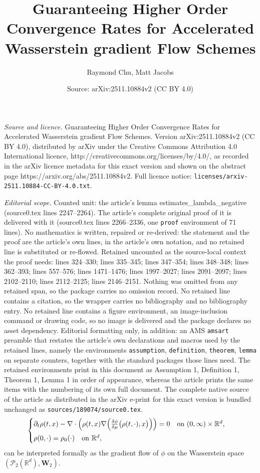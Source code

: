 \documentclass[10pt,a4paper]{amsart}
\title{Guaranteeing Higher Order Convergence Rates for Accelerated Wasserstein gradient Flow Schemes}
\author{Raymond Chu, Matt Jacobs}
\date{Source: arXiv:2511.10884v2 (CC BY 4.0)}
\newcommand{\PP}{\mathcal{P}}
\newcommand{\R}{{\mathbb R}}
\begin{document}
\maketitle

\noindent\emph{Source and licence.} Guaranteeing Higher Order Convergence Rates for Accelerated Wasserstein gradient Flow Schemes. Version arXiv:2511.10884v2 (CC BY 4.0), distributed by arXiv under the Creative Commons Attribution 4.0 International licence, http://creativecommons.org/licenses/by/4.0/, as recorded in the arXiv licence metadata for this exact version and shown on the abstract page https://arxiv.org/abs/2511.10884v2. Full licence notice: \texttt{licenses/arxiv-2511.10884-CC-BY-4.0.txt}.\par\smallskip

\noindent\textit{Editorial scope.} Counted unit: the article's lemma estimates\_lambda\_negative (source0.tex lines 2247--2264). The article's complete original proof of it is delivered with it (source0.tex lines 2266--2336, one \texttt{proof} environment of 71 lines). No mathematics is written, repaired or re-derived: the statement and the proof are the article's own lines, in the article's own notation, and no retained line is substituted or re-flowed.  Retained uncounted as the source-local context the proof needs: lines 324--330; lines 335--345; lines 347--354; lines 348--348; lines 362--393; lines 557--576; lines 1471--1476; lines 1997--2027; lines 2091--2097; lines 2102--2110; lines 2112--2125; lines 2146--2151.  Nothing was omitted from any retained span, so the package carries no omission record.  No retained line contains a citation, so the wrapper carries no bibliography and no bibliography entry.  No retained line contains a figure environment, an image-inclusion command or drawing code, so no image is delivered and the package declares no asset dependency.  Editorial formatting only, in addition: an AMS \texttt{amsart} preamble that restates the article's own declarations and macros used by the retained lines, namely the environments \texttt{assumption}, \texttt{definition}, \texttt{theorem}, \texttt{lemma} on separate counters, together with the standard packages those lines need.  The retained environments print in this document as Assumption 1, Definition 1, Theorem 1, Lemma 1 in order of appearance, whereas the article prints the same items with the numbering of its own full document.  The complete native source of the article as distributed in the arXiv e-print for this exact version is bundled unchanged as \texttt{sources/189074/source0.tex}.
\begin{equation}
\label{gradient_flow_eqn12}
\begin{cases}
 \partial_t \rho(t,x) - \nabla\cdot \Bigl(\rho(t,x) \nabla\Bigl(\tfrac{\delta \phi}{\delta \mu}\bigl(\rho(t,\cdot),x\bigr)\Bigr)\Bigr) = 0 \quad \text{on } (0,\infty)\times\mathbb{R}^d,\\[6pt]
 \rho(0,\cdot) = \rho_0(\cdot) \quad \text{on } \mathbb{R}^d,
\end{cases}
\end{equation} can be interpreted formally as the gradient flow of $\phi$ on the Wasserstein space $(\PP_2(\R^d), \mathbf{W}_2)$.
\end{document}
